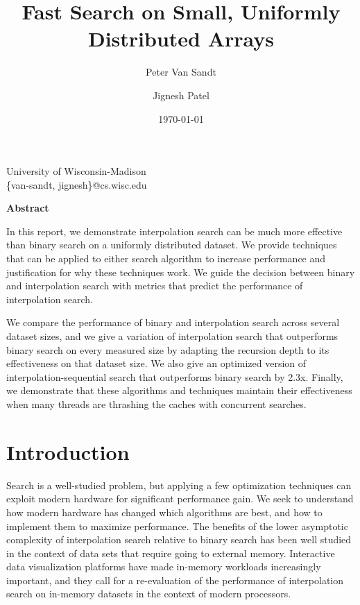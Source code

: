 \documentclass[twocolumn]{article}
\title{Fast Search on Small, Uniformly Distributed Arrays}
\date{\today}
\author{Peter Van Sandt \and Jignesh Patel}
\begin{document}


  \onecolumn
\maketitle
\begin{center}
University of Wisconsin-Madison \\
\{van-sandt, jignesh\}@cs.wisc.edu
\end{center}

\begin{center}
\textbf{Abstract}
\end{center}

In this report, we demonstrate interpolation search can be much more effective than binary search on a uniformly distributed dataset. We provide techniques that can be applied to either search algorithm to increase performance and justification for why these techniques work. We guide the decision between binary and interpolation search with metrics that predict the performance of interpolation search.

We compare the performance of binary and interpolation search across several dataset sizes, and we give a variation of interpolation search that outperforms binary search on every measured size by adapting the recursion depth to its effectiveness on that dataset size. We also give an optimized version of interpolation-sequential search that outperforms binary search by 2.3x. Finally, we demonstrate that these algorithms and techniques maintain their effectiveness when many threads are thrashing the caches with concurrent searches.

\twocolumn
\section{Introduction}
\label{introduction}
Search is a well-studied problem, but applying a few optimization techniques can exploit modern hardware for significant performance gain. We seek to understand how modern hardware has changed which algorithms are best, and how to implement them to maximize performance. The benefits of the lower asymptotic complexity of interpolation search relative to binary search has been well studied in the context of data sets that require going to external memory. \cite{manolopoulos-kollias-burton} Interactive data visualization platforms have made in-memory workloads increasingly important, and they call for a re-evaluation of the performance of interpolation search on in-memory datasets in the context of modern processors.
\end{document}
